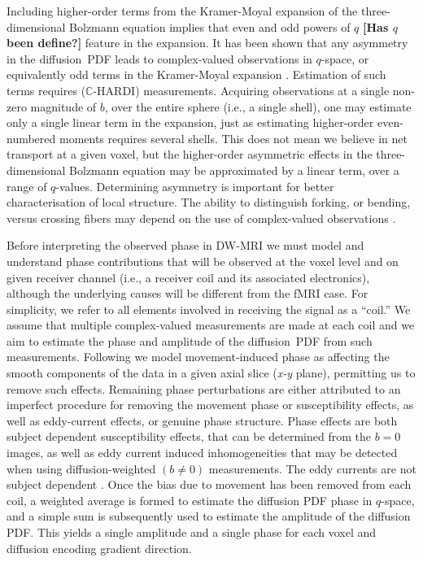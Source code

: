 \documentclass[authoryear,preprint,12pt]{elsarticle}
\newcommand{\bbC}{\mathbb{C}}
\begin{document}
Including higher-order terms from the Kramer-Moyal expansion of the
three-dimensional Bolzmann equation implies that even and odd powers
of $q$ \textbf{[Has $q$ been define?]} feature in the expansion.  It
has been shown that any asymmetry in the diffusion~PDF leads to
complex-valued observations in $q$-space, or equivalently odd terms in
the Kramer-Moyal expansion \citep{Liu2005}.  Estimation of such terms
requires ($\bbC$-HARDI) measurements.  Acquiring observations at a
single non-zero magnitude of $b$, over the entire sphere (i.e., a
single shell), one may estimate only a single linear term in the
expansion, just as estimating higher-order even-numbered moments
requires several shells.  This does not mean we believe in net
transport at a given voxel, but the higher-order asymmetric effects in
the three-dimensional Bolzmann equation may be approximated by a
linear term, over a range of $q$-values.  Determining asymmetry is
important for better characterisation of local structure.  The ability
to distinguish forking, or bending, versus crossing fibers may depend
on the use of complex-valued observations \citep{Liu2005}.

Before interpreting the observed phase in DW-MRI we must model and
understand phase contributions that will be observed at the voxel
level and on given receiver channel (i.e., a receiver coil and its
associated electronics), although the underlying causes will be
different from the fMRI case.  For simplicity, we refer to all
elements involved in receiving the signal as a ``coil.''  We assume
that multiple complex-valued measurements are made at each coil and we
aim to estimate the phase and amplitude of the diffusion~PDF from such
measurements.  Following \citet{Aksoyetal2008} we model
movement-induced phase as affecting the smooth components of the data
in a given axial slice (\textit{x-y} plane), permitting us to remove
such effects.  Remaining phase perturbations are either attributed to
an imperfect procedure for removing the movement phase or
susceptibility effects, as well as eddy-current effects, or genuine
phase structure.  Phase effects are both subject dependent
susceptibility effects, that can be determined from the $b=0$ images,
as well as eddy current induced inhomogeneities that may be detected
when using diffusion-weighted $(b\neq{0})$ measurements.  The eddy
currents are not subject dependent \citep{Truong2008}.  Once the bias
due to movement has been removed from each coil, a weighted average is
formed to estimate the diffusion PDF phase in $q$-space, and a simple
sum is subsequently used to estimate the amplitude of the diffusion
PDF.  This yields a single amplitude and a single phase for each voxel
and diffusion encoding gradient direction.
\end{document}
